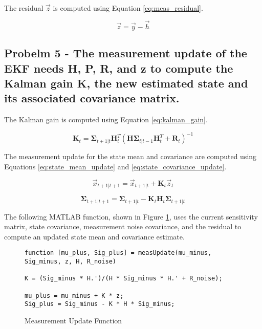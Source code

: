 The residual $\vec{z}$ is computed using Equation \ref{eq:meas_residual}.

\begin{equation} \label{eq:meas_residual}
    \vec{z} = \vec{y} - \vec{h}
\end{equation}

\subsection{Probelm 5 - The measurement update of the EKF needs H, P, R, and z to compute the Kalman gain K, the new estimated state and its associated covariance matrix.}

The Kalman gain is computed using Equation \ref{eq:kalman_gain}.

\begin{equation} \label{eq:kalman_gain}
    \boldsymbol{K}_t = \boldsymbol{\Sigma}_{t+1 \vert t} \boldsymbol{H}_t^T \left( \boldsymbol{H} \boldsymbol{\Sigma}_{t \vert t-1} \boldsymbol{H}_t^T + \boldsymbol{R}_t \right)^{-1}
\end{equation}

The measurement update for the state mean and covariance are computed using Equations \ref{eq:state_mean_update} and \ref{eq:state_covariance_update}.

\begin{equation} \label{eq:state_mean_update}
    \vec{x}_{t+1 \vert t+1} = \vec{x}_{t+1 \vert t} + \boldsymbol{K}_t \vec{z}_t
\end{equation}

\begin{equation} \label{eq:state_covariance_update}
    \boldsymbol{\Sigma}_{t+1 \vert t+1} = \boldsymbol{\Sigma}_{t+1 \vert t} - \boldsymbol{K}_t \boldsymbol{H}_t \boldsymbol{\Sigma}_{t+1 \vert t}
\end{equation}

The following MATLAB function, shown in Figure \ref{fig:meas_update_matlab_func}, uses the current sensitivity matrix, state covariance, measurement noise covariance, and the residual to compute an updated state mean and covariance estimate.

\begin{figure}
    \centering
    \captionsetup{ justification = centering}
    \begin{lstlisting}
function [mu_plus, Sig_plus] = measUpdate(mu_minus, Sig_minus, z, H, R_noise)

K = (Sig_minus * H.')/(H * Sig_minus * H.' + R_noise);

mu_plus = mu_minus + K * z;
Sig_plus = Sig_minus - K * H * Sig_minus;
    \end{lstlisting}
    \caption{Measurement Update Function}
    \label{fig:meas_update_matlab_func}
\end{figure}

